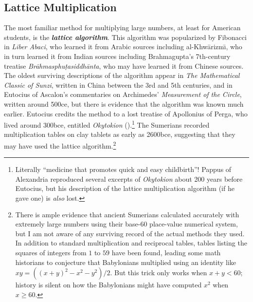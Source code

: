 \subsection{Lattice Multiplication}
The most familiar method for multiplying large numbers, at least for American students, is the \textbf{\textit{lattice algorithm}}. This algorithm was popularized by Fibonacci in \textit{Liber Abaci}, who learned it from Arabic sources including al-Khw\=arizm\=\i, who in turn learned it from Indian sources including Brahmagupta’s 7th-century treatise \textit{Br\=ahmasphu\d{t}asiddh\=anta}, who may have learned it from Chinese sources. The oldest surviving descriptions of the algorithm appear in \textit{The Mathematical Classic of Sunzi}, written in China between the 3rd and 5th centuries, and in Eutocius of Ascalon’s commentaries on Archimedes’ \textit{Measurement of the Circle}, written around 500ce, but there is evidence that the algorithm was known much earlier. Eutocius credits the method to a lost treatise of Apollonius of Perga, who lived around 300bce, entitled \textit{Okytokion} ().\footnote{Literally “medicine that promotes quick and easy childbirth”! Pappus of Alexandria reproduced several excerpts of \textit{Okytokion} about 200 years before Eutocius, but his description of the lattice multiplication algorithm (if he gave one) is \textit{also} lost.} The Sumerians recorded multiplication tables on clay tablets as early as 2600bce, suggesting that they may have used the lattice algorithm.\footnote{There is ample evidence that ancient Sumerians calculated accurately with extremely large numbers using their base-60 place-value numerical system, but I am not aware of any surviving record of the actual methods they used. In addition to standard multiplication and reciprocal tables, tables listing the squares of integers from $1$ to $59$ have been found, leading some math historians to conjecture that Babylonians multiplied using an identity like $x y = ((x+y)^2 - x^2 - y^2)/2$. But this trick only works when $x + y < 60$; history is silent on how the Babylonians might have computed $x^2$ when $x \ge 60$.}

